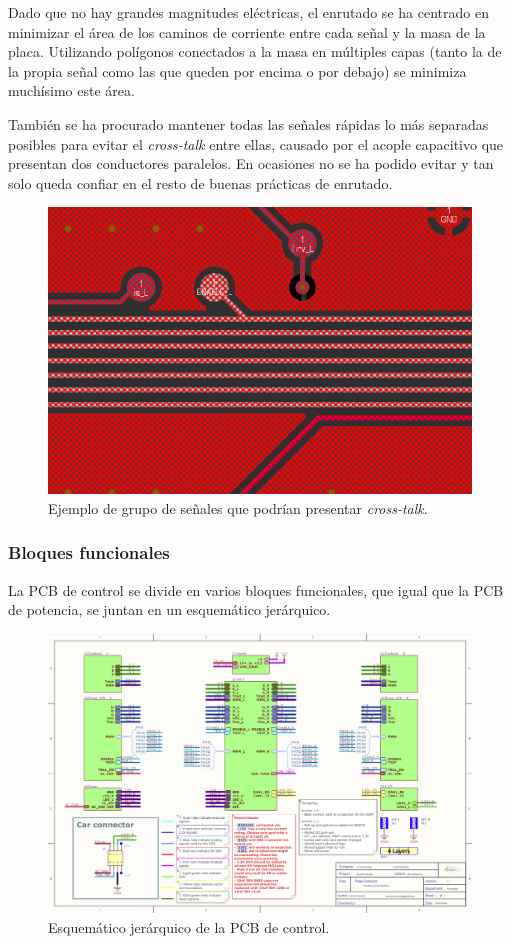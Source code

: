 Dado que no hay grandes magnitudes eléctricas, el enrutado se ha centrado en minimizar el área de los caminos de corriente entre cada señal y la masa de la placa. Utilizando polígonos conectados a la masa en múltiples capas (tanto la de la propia señal como las que queden por encima o por debajo) se minimiza muchísimo este área.

También se ha procurado mantener todas las señales rápidas lo más separadas posibles para evitar el \textit{cross-talk} entre ellas, causado por el acople capacitivo que presentan dos conductores paralelos. En ocasiones no se ha podido evitar y tan solo queda confiar en el resto de buenas prácticas de enrutado.

\begin{figure}[H]
	\centering
	\includegraphics[width=0.7\linewidth]{fig/cross-talk-example}
	\caption{Ejemplo de grupo de señales que podrían presentar \textit{cross-talk}.}
\end{figure}


\subsubsection{Bloques funcionales}

La PCB de control se divide en varios bloques funcionales, que igual que la PCB de potencia, se juntan en un esquemático jerárquico. 
	
\begin{figure}[H]
	\centering
	\includegraphics[width=0.7\linewidth]{fig/schControl1}
	\caption{Esquemático jerárquico de la PCB de control.}
\end{figure}

